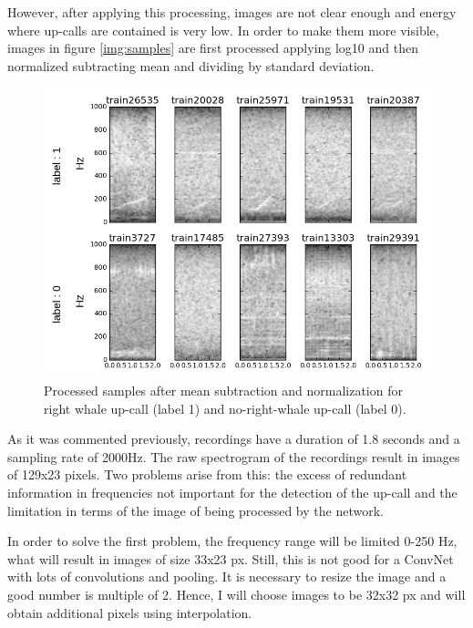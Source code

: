\documentclass[]{article}
\begin{document}
However, after applying this processing, images are not clear enough and energy where up-calls are contained is very low. In order to make them more visible, images in figure \ref{img:samples} are first processed applying log10 and then normalized subtracting mean and dividing by standard deviation.

\begin{figure}[htpb!]
\centering
\includegraphics[width= \textwidth]{./images/2_samples_processed}
\caption{Processed samples after mean subtraction and normalization for right whale up-call (label 1) and no-right-whale up-call (label 0).  \label{img:samples_processed}}
\end{figure} 

As it was commented previously, recordings have a duration of 1.8 seconds and a sampling rate of 2000Hz. The raw spectrogram of the recordings result in images of 129x23 pixels. Two problems arise from this: the excess of redundant information in frequencies not important for the detection of the up-call and the limitation in terms of the image of being processed by the network.

In order to solve the first problem, the frequency range will be limited 0-250 Hz, what will result in images of size 33x23 px. Still, this is not good for a ConvNet with lots of convolutions and pooling. It is necessary to resize the image and a good number is multiple of 2. Hence, I will choose images to be 32x32 px and will obtain additional pixels using interpolation. %
\end{document}
